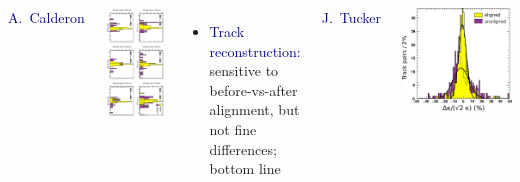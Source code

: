 \documentclass[compress]{beamer}
\begin{document}
\begin{frame}
\begin{columns}
\vspace{-0.25 cm}
\hfill \textcolor{darkblue}{A.~Calderon}

\includegraphics[height=\linewidth, angle=90]{segment_extrapolation.pdf}

\begin{itemize}
\item \textcolor{darkblue}{Track reconstruction:} sensitive to before-vs-after alignment, but not fine differences; bottom line
\end{itemize}

\hfill \textcolor{darkblue}{J.~Tucker}

\vspace{-0.4 cm}
\centering
\includegraphics[width=0.5\linewidth]{onlyhip.pdf}
\end{columns}
\end{frame}
\end{document}
